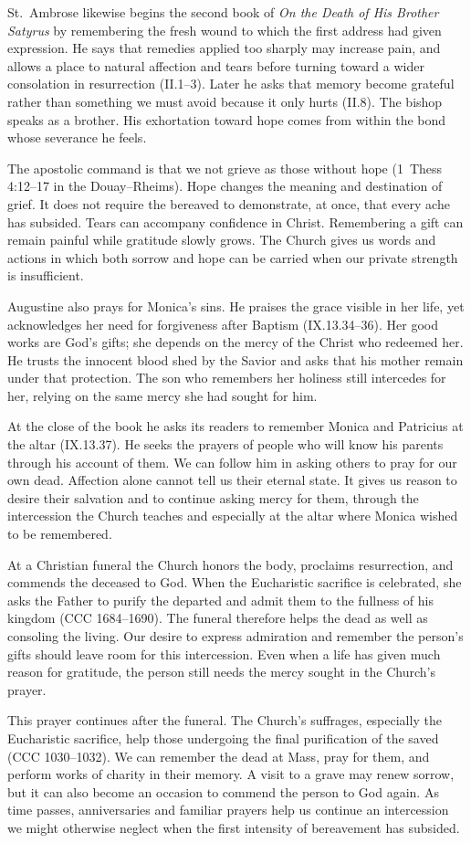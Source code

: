 St.~Ambrose likewise begins the second book of \emph{On the Death of His Brother Satyrus} by remembering the fresh wound to which the first address had given expression. He says that remedies applied too sharply may increase pain, and allows a place to natural affection and tears before turning toward a wider consolation in resurrection (II.1--3). Later he asks that memory become grateful rather than something we must avoid because it only hurts (II.8). The bishop speaks as a brother. His exhortation toward hope comes from within the bond whose severance he feels.

The apostolic command is that we not grieve as those without hope (1~Thess 4:12--17 in the Douay--Rheims). Hope changes the meaning and destination of grief. It does not require the bereaved to demonstrate, at once, that every ache has subsided. Tears can accompany confidence in Christ. Remembering a gift can remain painful while gratitude slowly grows. The Church gives us words and actions in which both sorrow and hope can be carried when our private strength is insufficient.

Augustine also prays for Monica's sins. He praises the grace visible in her life, yet acknowledges her need for forgiveness after Baptism (IX.13.34--36). Her good works are God's gifts; she depends on the mercy of the Christ who redeemed her. He trusts the innocent blood shed by the Savior and asks that his mother remain under that protection. The son who remembers her holiness still intercedes for her, relying on the same mercy she had sought for him.

At the close of the book he asks its readers to remember Monica and Patricius at the altar (IX.13.37). He seeks the prayers of people who will know his parents through his account of them. We can follow him in asking others to pray for our own dead. Affection alone cannot tell us their eternal state. It gives us reason to desire their salvation and to continue asking mercy for them, through the intercession the Church teaches and especially at the altar where Monica wished to be remembered.

At a Christian funeral the Church honors the body, proclaims resurrection, and commends the deceased to God. When the Eucharistic sacrifice is celebrated, she asks the Father to purify the departed and admit them to the fullness of his kingdom (CCC 1684--1690). The funeral therefore helps the dead as well as consoling the living. Our desire to express admiration and remember the person's gifts should leave room for this intercession. Even when a life has given much reason for gratitude, the person still needs the mercy sought in the Church's prayer.

This prayer continues after the funeral. The Church's suffrages, especially the Eucharistic sacrifice, help those undergoing the final purification of the saved (CCC 1030--1032). We can remember the dead at Mass, pray for them, and perform works of charity in their memory. A visit to a grave may renew sorrow, but it can also become an occasion to commend the person to God again. As time passes, anniversaries and familiar prayers help us continue an intercession we might otherwise neglect when the first intensity of bereavement has subsided.

